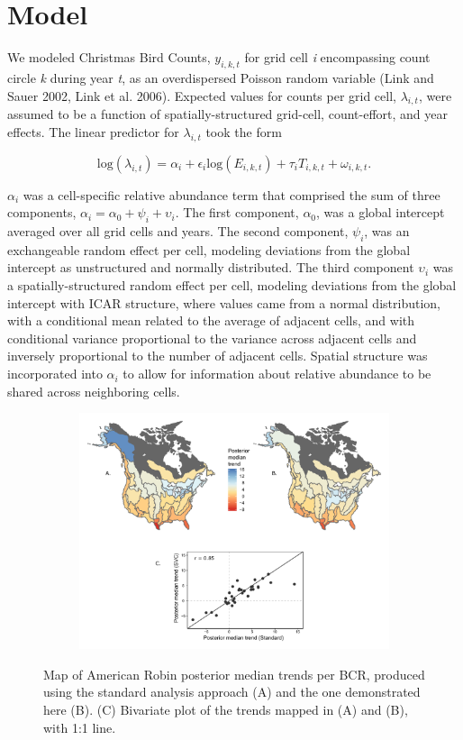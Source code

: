 \documentclass[]{article}
\begin{document}
\section{Model}
We modeled Christmas Bird Counts, $y_{i,k,t}$ for grid cell \textit{i} encompassing count circle \textit{k} during year \textit{t}, as an overdispersed Poisson random variable (Link and Sauer 2002, Link et al. 2006). Expected values for counts per grid cell, $\lambda_{i,t}$, were assumed to be a function of spatially-structured grid-cell, count-effort, and year effects. The linear predictor for $\lambda_{i,t}$ took the form

$$\text{log}(\lambda_{i,t}) = \alpha _{i} + \epsilon_{i} \text{log}(E_{i,k,t}) + \tau_{i}T_{i,k,t} + \omega_{i,k,t}.$$

$\alpha_i$ was a cell-specific relative abundance term that comprised the sum of three components, $\alpha_i = \alpha_0 + \psi_i + \upsilon_i$. The first component, $\alpha_0$, was a global intercept averaged over all grid cells and years. The second component, $\psi_i$, was an exchangeable random effect per cell, modeling deviations from the global intercept as unstructured and normally distributed. The third component $\upsilon_i$ was a spatially-structured random effect per cell, modeling deviations from the global intercept with ICAR structure, where values came from a normal distribution, with a conditional mean related to the average of adjacent cells, and with conditional variance proportional to the variance across adjacent cells and inversely proportional to the number of adjacent cells. Spatial structure was incorporated into $\alpha_i$ to allow for information about relative abundance to be shared across neighboring cells.

\begin{figure}[t]
  \centering
  \begin{subfigure}[t]{0.99\textwidth}
    \centering
    \includegraphics[width=\textwidth]{bcr_comparison} 
  \end{subfigure}
  \caption{Map of American Robin posterior median trends per BCR, produced using the standard analysis approach (A) and the one demonstrated here (B). (C) Bivariate plot of the trends mapped in (A) and (B), with 1:1 line.}
\end{figure}
\end{document}
